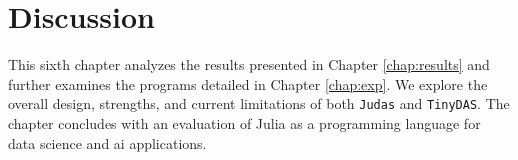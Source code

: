 \chapter{Discussion}
\label{chap:disc}

This sixth chapter analyzes the results presented in Chapter \ref{chap:results} and further examines the programs detailed in Chapter \ref{chap:exp}. We explore the overall design, strengths, and current limitations of both \texttt{Judas} and \texttt{TinyDAS}. The chapter concludes with an evaluation of Julia as a programming language for data science and \acrshort{ai} applications.



